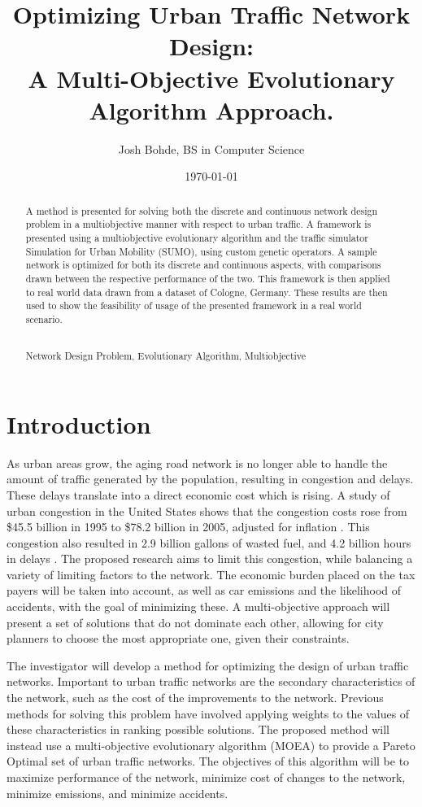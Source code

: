 \documentclass[11pt, oneside, notitlepage, final]{article}
\newcommand{\keywords}[1]{\par\addvspace\baselineskip
\noindent\enspace\ignorespaces\centering{\bf Keywords}\\#1}
\begin{document}
\title{Optimizing Urban Traffic Network Design:\\ A Multi-Objective Evolutionary Algorithm Approach.}
\author{Josh Bohde, BS in Computer Science}
\date{\today}
\maketitle

\begin{abstract}
A method is presented for solving both the discrete and continuous network design problem in a multiobjective manner with respect to urban traffic. A framework is presented using a multiobjective evolutionary algorithm and the traffic simulator Simulation for Urban Mobility (SUMO), using custom genetic operators. A sample network is optimized for both its discrete and continuous aspects, with comparisons drawn between the respective performance of the two. This framework is then applied to real world data drawn from a dataset of Cologne, Germany. These results are then used to show the feasibility of usage of the presented framework in a real world scenario.
\keywords{Network Design Problem, Evolutionary Algorithm, Multiobjective}
\end{abstract}

\clearpage
\part{Introduction}
    As urban areas grow, the aging road network is no longer able to handle the amount of traffic generated by the population, resulting in congestion and delays. These delays translate into a direct economic cost which is rising. A study of urban congestion in the United States  shows that the congestion costs rose from \$45.5 billion in 1995 to \$78.2 billion in 2005, adjusted for inflation \cite{7}. This congestion also resulted in 2.9 billion gallons of wasted fuel, and 4.2 billion hours in delays \cite{7}. The proposed research aims to limit this congestion, while balancing a variety of limiting factors to the network. The economic burden placed on the tax payers will be taken into account, as well as car emissions and the likelihood of accidents,  with the goal of minimizing these. A multi-objective approach will present a set of solutions that do not dominate each other, allowing for city planners to choose the most appropriate one, given their constraints.

    The investigator will develop a method for optimizing the design of urban traffic networks. Important to urban traffic networks are the secondary characteristics of the network, such as the cost of the improvements to the network. Previous methods for solving this problem have involved applying weights to the values of these characteristics in ranking possible solutions. The proposed method will instead use a multi-objective evolutionary algorithm (MOEA) to provide a Pareto Optimal set of urban traffic networks. The objectives of this algorithm will be to maximize performance of the network, minimize cost of changes to the network, minimize emissions, and minimize accidents.
\end{document}
